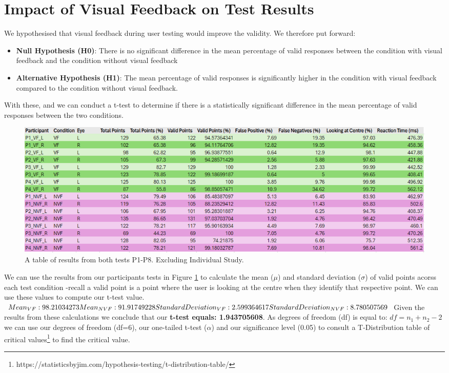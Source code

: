 \documentclass{l4proj}
\begin{document}
\section{Impact of Visual Feedback on Test Results} \label{evaluation:Visual_Feedback}
We hypothesised that visual feedback during user testing would improve the validity. We therefore put forward:
\begin{itemize}
    \item \textbf{Null Hypothesis (H0)}: There is no significant difference in the mean percentage of valid responses between the condition with visual feedback and the condition without visual feedback
    \item \textbf{Alternative Hypothesis (H1)}: The mean percentage of valid responses is significantly higher in the condition with visual feedback compared to the condition without visual feedback.
\end{itemize}
With these, and we can conduct a t-test to determine if there is a statistically significant difference in the mean percentage of valid responses between the two conditions. 
\begin{figure}[htbp]
    \centering
    \includegraphics[width=1\linewidth]{dissertation/images/Results.png}    

    \caption{A table of results from both tests P1-P8. Excluding Individual Study.}
    \label{fig:results} 
\end{figure}
\newline
We can use the results from our participants tests in Figure \ref{fig:results} to calculate the mean ($\mu$) and standard deviation ($\sigma$) of valid points acorss each test condition -recall a valid point is a point where the user is looking at the centre when they identify that respective point. We can use these values to compute our t-test value. \newline
\newline
$Mean_{VF}: 98.21034273 \newline 
Mean_{NVF}: 91.91749228 \newline
\newline
Standard Deviation_{VF}: 2.599364617 \newline
Standard Deviation_{NVF}: 8.780507569$
\newline
\newline
Given the results from these calculations we conclude that our \textbf{t-test equals: 1.943705608}. As degrees of freedom (df) is equal to:
$df = n_1 + n_2 -2$
we can use our degrees of freedom (df=6), our one-tailed t-test ($\alpha$) and our significance level (0.05) to consult a T-Distribution table of critical values\footnote{https://statisticsbyjim.com/hypothesis-testing/t-distribution-table/} to find the critical value.
\end{document}
